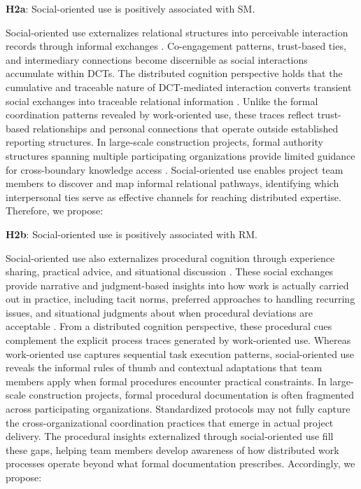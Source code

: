 \documentclass[authoryear,preprint,review,times,10pt]{elsarticle}
\begin{document}
\textbf{H2a}: Social-oriented use is positively associated with SM.

Social-oriented use externalizes relational structures into perceivable interaction records through informal exchanges \citep{huang2017Ties}. Co-engagement patterns, trust-based ties, and intermediary connections become discernible as social interactions accumulate within DCTs. The distributed cognition perspective holds that the cumulative and traceable nature of DCT-mediated interaction converts transient social exchanges into traceable relational information \citep{leonardi2014Social}. Unlike the formal coordination patterns revealed by work-oriented use, these traces reflect trust-based relationships and personal connections that operate outside established reporting structures. In large-scale construction projects, formal authority structures spanning multiple participating organizations provide limited guidance for cross-boundary knowledge access \citep{shen2022Largescale}. Social-oriented use enables project team members to discover and map informal relational pathways, identifying which interpersonal ties serve as effective channels for reaching distributed expertise. Therefore, we propose:

\textbf{H2b}: Social-oriented use is positively associated with RM.

Social-oriented use also externalizes procedural cognition through experience sharing, practical advice, and situational discussion \citep{ali-hassan2015Linking}. These social exchanges provide narrative and judgment-based insights into how work is actually carried out in practice, including tacit norms, preferred approaches to handling recurring issues, and situational judgments about when procedural deviations are acceptable \citep{barmeyer2019Informal}. From a distributed cognition perspective, these procedural cues complement the explicit process traces generated by work-oriented use. Whereas work-oriented use captures sequential task execution patterns, social-oriented use reveals the informal rules of thumb and contextual adaptations that team members apply when formal procedures encounter practical constraints. In large-scale construction projects, formal procedural documentation is often fragmented across participating organizations. Standardized protocols may not fully capture the cross-organizational coordination practices that emerge in actual project delivery. The procedural insights externalized through social-oriented use fill these gaps, helping team members develop awareness of how distributed work processes operate beyond what formal documentation prescribes. Accordingly, we propose:
\end{document}
